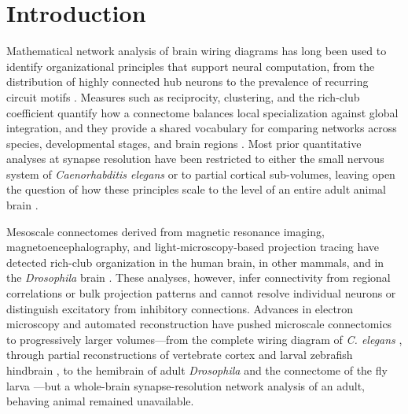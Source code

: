 \section{Introduction}

Mathematical network analysis of brain wiring diagrams has long been used to identify organizational principles that support neural computation, from the distribution of highly connected hub neurons to the prevalence of recurring circuit motifs \cite{sporns2004organization,bullmore2009complex,milo2002network}. Measures such as reciprocity, clustering, and the rich-club coefficient quantify how a connectome balances local specialization against global integration, and they provide a shared vocabulary for comparing networks across species, developmental stages, and brain regions \cite{watts1998collective,colizza2006detecting,vandenheuvel2011rich}. Most prior quantitative analyses at synapse resolution have been restricted to either the small nervous system of \textit{Caenorhabditis elegans} or to partial cortical sub-volumes, leaving open the question of how these principles scale to the level of an entire adult animal brain \cite{varshney2011structural,cook2019whole,song2005highly,motta2019dense}.

Mesoscale connectomes derived from magnetic resonance imaging, magnetoencephalography, and light-microscopy-based projection tracing have detected rich-club organization in the human brain, in other mammals, and in the \textit{Drosophila} brain \cite{vandenheuvel2011rich,fornito2015connectomics,shih2015connectomics}. These analyses, however, infer connectivity from regional correlations or bulk projection patterns and cannot resolve individual neurons or distinguish excitatory from inhibitory connections. Advances in electron microscopy and automated reconstruction have pushed microscale connectomics to progressively larger volumes---from the complete wiring diagram of \textit{C. elegans} \cite{white1986structure,cook2019whole,varshney2011structural}, through partial reconstructions of vertebrate cortex \cite{song2005highly,motta2019dense,loomba2022connectomic} and larval zebrafish hindbrain \cite{svara2022automated}, to the hemibrain of adult \textit{Drosophila} \cite{scheffer2020connectome} and the connectome of the fly larva \cite{winding2023connectome}---but a whole-brain synapse-resolution network analysis of an adult, behaving animal remained unavailable.

